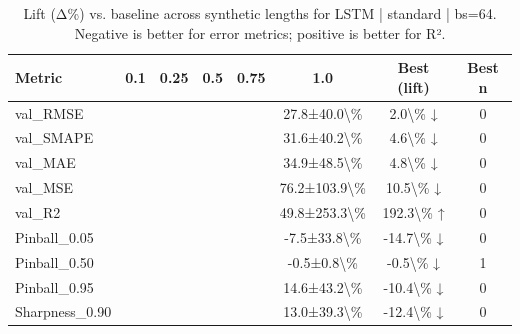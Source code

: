 \begin{table}
\caption{Lift (Δ\%) vs. baseline across synthetic lengths for LSTM | standard | bs=64. Negative is better for error metrics; positive is better for R².}
\label{tab:lift_LSTM_standard_bs64}
\begin{tabular}{lccccccc}
\toprule
Metric & 0.1 & 0.25 & 0.5 & 0.75 & 1.0 & Best (lift) & Best n \\
\midrule
val\_RMSE &  &  &  &  & 27.8±40.0\textbackslash \% & 2.0\textbackslash \% ↓ & 0 \\
val\_SMAPE &  &  &  &  & 31.6±40.2\textbackslash \% & 4.6\textbackslash \% ↓ & 0 \\
val\_MAE &  &  &  &  & 34.9±48.5\textbackslash \% & 4.8\textbackslash \% ↓ & 0 \\
val\_MSE &  &  &  &  & 76.2±103.9\textbackslash \% & 10.5\textbackslash \% ↓ & 0 \\
val\_R2 &  &  &  &  & 49.8±253.3\textbackslash \% & 192.3\textbackslash \% ↑ & 0 \\
Pinball\_0.05 &  &  &  &  & -7.5±33.8\textbackslash \% & -14.7\textbackslash \% ↓ & 0 \\
Pinball\_0.50 &  &  &  &  & -0.5±0.8\textbackslash \% & -0.5\textbackslash \% ↓ & 1 \\
Pinball\_0.95 &  &  &  &  & 14.6±43.2\textbackslash \% & -10.4\textbackslash \% ↓ & 0 \\
Sharpness\_0.90 &  &  &  &  & 13.0±39.3\textbackslash \% & -12.4\textbackslash \% ↓ & 0 \\
\bottomrule
\end{tabular}
\end{table}
